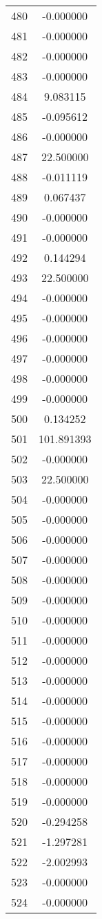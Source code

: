 \documentclass[12pt]{article}
\begin{document}
\begin{longtable}{@{}cc@{}}
480 & -0.000000 \\
481 & -0.000000 \\
482 & -0.000000 \\
483 & -0.000000 \\
484 & 9.083115 \\
485 & -0.095612 \\
486 & -0.000000 \\
487 & 22.500000 \\
488 & -0.011119 \\
489 & 0.067437 \\
490 & -0.000000 \\
491 & -0.000000 \\
492 & 0.144294 \\
493 & 22.500000 \\
494 & -0.000000 \\
495 & -0.000000 \\
496 & -0.000000 \\
497 & -0.000000 \\
498 & -0.000000 \\
499 & -0.000000 \\
500 & 0.134252 \\
501 & 101.891393 \\
502 & -0.000000 \\
503 & 22.500000 \\
504 & -0.000000 \\
505 & -0.000000 \\
506 & -0.000000 \\
507 & -0.000000 \\
508 & -0.000000 \\
509 & -0.000000 \\
510 & -0.000000 \\
511 & -0.000000 \\
512 & -0.000000 \\
513 & -0.000000 \\
514 & -0.000000 \\
515 & -0.000000 \\
516 & -0.000000 \\
517 & -0.000000 \\
518 & -0.000000 \\
519 & -0.000000 \\
520 & -0.294258 \\
521 & -1.297281 \\
522 & -2.002993 \\
523 & -0.000000 \\
524 & -0.000000 \\

\end{longtable}
\end{document}
